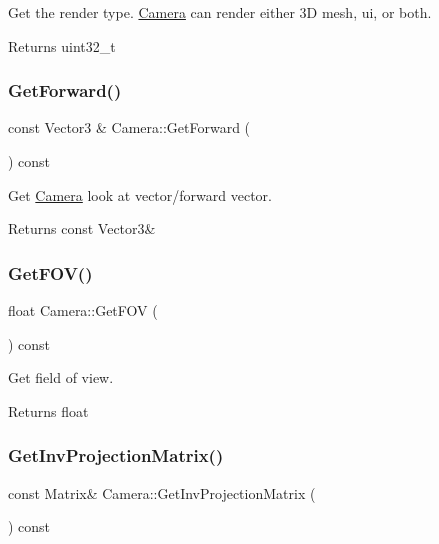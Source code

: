 Get the render type. \hyperlink{classCamera}{Camera} can render either 3D mesh, ui, or both. 

\begin{DoxyReturn}{Returns}
uint32\+\_\+t 
\end{DoxyReturn}
\mbox{\label{classCamera_a2b34df2f0303bac1ed652bc3186e5a98}} 
\subsubsection{\texorpdfstring{Get\+Forward()}{GetForward()}}
{\footnotesize\ttfamily const Vector3 \& Camera\+::\+Get\+Forward (\begin{DoxyParamCaption}{ }\end{DoxyParamCaption}) const}



Get \hyperlink{classCamera}{Camera} look at vector/forward vector. 

\begin{DoxyReturn}{Returns}
const Vector3\& 
\end{DoxyReturn}
\mbox{\label{classCamera_aacd8360b4fb585a3cdc44ea83e55fc36}} 
\subsubsection{\texorpdfstring{Get\+F\+O\+V()}{GetFOV()}}
{\footnotesize\ttfamily float Camera\+::\+Get\+F\+OV (\begin{DoxyParamCaption}{ }\end{DoxyParamCaption}) const}



Get field of view. 

\begin{DoxyReturn}{Returns}
float 
\end{DoxyReturn}
\mbox{\label{classCamera_a8c4b6ade261f29d41517bd1674404ccc}} 
\subsubsection{\texorpdfstring{Get\+Inv\+Projection\+Matrix()}{GetInvProjectionMatrix()}}
{\footnotesize\ttfamily const Matrix\& Camera\+::\+Get\+Inv\+Projection\+Matrix (\begin{DoxyParamCaption}{ }\end{DoxyParamCaption}) const\hspace{0.3cm}{\ttfamily [inline]}}



